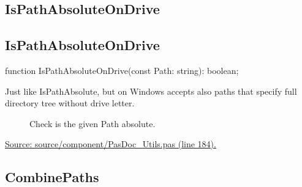\documentclass{report}
\newif\ifpdf
\begin{document}
\subsection*{\large{\textbf{IsPathAbsoluteOnDrive}}\normalsize\hspace{1ex}\hrulefill}
\else
\subsection*{IsPathAbsoluteOnDrive}
\fi
\label{PasDoc_Utils-IsPathAbsoluteOnDrive}
\begin{list}{}{
\setlength{\itemindent}{0cm}
\setlength{\listparindent}{0cm}
\setlength{\leftmargin}{\evensidemargin}
\addtolength{\leftmargin}{\tmplength}
\settowidth{\labelsep}{X}
\addtolength{\leftmargin}{\labelsep}
\setlength{\labelwidth}{\tmplength}
}
\item[\textbf{Declaration}\hfill]
\ifpdf
\begin{flushleft}
\fi
\begin{ttfamily}
function IsPathAbsoluteOnDrive(const Path: string): boolean;\end{ttfamily}

\ifpdf
\end{flushleft}
\fi

\par
\item[\textbf{Description}]
Just like IsPathAbsolute, but on Windows accepts also paths that specify full directory tree without drive letter.

\item[\textbf{See also}]
\begin{description}
\item[\begin{ttfamily}IsPathAbsolute\end{ttfamily}(\ref{PasDoc_Utils-IsPathAbsolute})] 
Check is the given Path absolute.
\end{description}
\par
\href{https://github.com/pasdoc/pasdoc/blob/master/source/component/PasDoc_Utils.pas#L184}{Source: source/component/PasDoc{\_}Utils.pas (line 184).}

\end{list}
\ifpdf
\subsection*{\large{\textbf{CombinePaths}}\normalsize\hspace{1ex}\hrulefill}
\else
\end{document}
